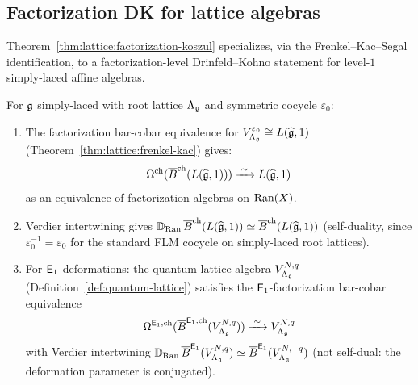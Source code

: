 \subsection{Factorization DK for lattice algebras}

Theorem~\ref{thm:lattice:factorization-koszul} specializes, via the
Frenkel--Kac--Segal identification, to a factorization-level
Drinfeld--Kohno statement for level-$1$ simply-laced affine algebras.

\begin{corollary}
\label{cor:lattice:factorization-dk-level1}
For $\mathfrak{g}$ simply-laced with root lattice $\Lambda_{\mathfrak{g}}$ and
symmetric cocycle $\varepsilon_0$:
\begin{enumerate}[label=(\roman*)]
\item The factorization bar-cobar equivalence for
  $V_{\Lambda_{\mathfrak{g}}}^{\varepsilon_0}
  \cong L(\widehat{\mathfrak{g}}, 1)$
  \textup{(}Theorem~\textup{\ref{thm:lattice:frenkel-kac})} gives:
  \[
  \Omega^{\mathrm{ch}}(\overline{B}^{\mathrm{ch}}(L(\widehat{\mathfrak{g}}, 1)))
  \xrightarrow{\;\sim\;}
  L(\widehat{\mathfrak{g}}, 1)
  \]
  as an equivalence of factorization algebras on $\operatorname{Ran}(X)$.

\item Verdier intertwining gives
  $\mathbb{D}_{\operatorname{Ran}}\, \overline{B}^{\mathrm{ch}}(L(\widehat{\mathfrak{g}}, 1))
  \simeq \overline{B}^{\mathrm{ch}}(L(\widehat{\mathfrak{g}}, 1))$
  \textup{(}self-duality, since $\varepsilon_0^{-1} = \varepsilon_0$
  for the standard FLM cocycle on simply-laced root lattices\textup{)}.

\item For $\mathsf{E}_1$-deformations: the quantum lattice algebra
  $V_{\Lambda_{\mathfrak{g}}}^{N,q}$
  \textup{(}Definition~\textup{\ref{def:quantum-lattice})} satisfies
  the $\mathsf{E}_1$-factorization bar-cobar equivalence
  \[
  \Omega^{\mathsf{E}_1,\mathrm{ch}}(
    \overline{B}^{\mathsf{E}_1,\mathrm{ch}}(V_{\Lambda_{\mathfrak{g}}}^{N,q}))
  \xrightarrow{\;\sim\;}
  V_{\Lambda_{\mathfrak{g}}}^{N,q}
  \]
  with Verdier intertwining
  $\mathbb{D}_{\operatorname{Ran}}\, \overline{B}^{\mathsf{E}_1}(V_{\Lambda_{\mathfrak{g}}}^{N,q})
  \simeq \overline{B}^{\mathsf{E}_1}(V_{\Lambda_{\mathfrak{g}}}^{N,-q})$
  \textup{(}not self-dual: the deformation parameter is
  conjugated\textup{)}.
\end{enumerate}
\end{corollary}

